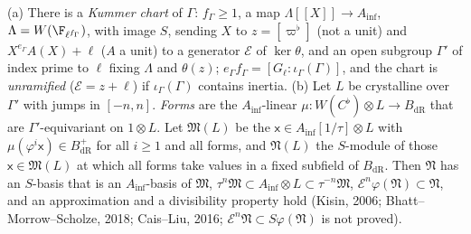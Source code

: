 \begin{fact}
\label{cg-lifting:fact:frame}
(a) There is a \emph{Kummer chart} of $\Gamma$: $f_\Gamma\ge1$, a map $\Lambda[[X]]\to A_{\inf}$,
$\Lambda=W(\F_{\ell^{f_\Gamma}})$, with image $S$, sending $X$ to $z=[\varpi^\flat]$ (not a unit) and
$X^{e_\Gamma}A(X)+\ell$ ($A$ a unit) to a generator $\mathcal E$ of $\ker\theta$, and an open subgroup $\Gamma'$ of index
prime to $\ell$ fixing $\Lambda$ and $\theta(z)$; $e_\Gamma f_\Gamma=[G_\ell:\iota_\Gamma(\Gamma)]$, and the chart is
\emph{unramified} ($\mathcal E=z+\ell$) if $\iota_\Gamma(\Gamma)$ contains inertia.
(b) Let $L$ be crystalline over $\Gamma'$ with jumps in $[-n,n]$. \emph{Forms} are the
$A_{\inf}$-linear $\mu\colon W(C^\flat)\otimes L\to B_{\mathrm{dR}}$ that are $\Gamma'$-equivariant on
$1\otimes L$. Let $\mathfrak M(L)$ be the $\mathsf x\in A_{\inf}[1/\tau]\otimes L$ with
$\mu(\varphi^i\mathsf x)\in B_{\mathrm{dR}}^+$ for all $i\ge1$ and all forms, and $\mathfrak N(L)$ the
$S$-module of those $\mathsf x\in\mathfrak M(L)$ at which all forms take values in a fixed subfield of $B_{\mathrm{dR}}$. Then
$\mathfrak N$ has an $S$-basis that is an $A_{\inf}$-basis of $\mathfrak M$,
$\tau^n\mathfrak M\subset A_{\inf}\otimes L\subset\tau^{-n}\mathfrak M$,
$\mathcal E^n\varphi(\mathfrak N)\subset\mathfrak N$, and an approximation and a divisibility property hold
(Kisin, 2006; Bhatt--Morrow--Scholze, 2018; Cais--Liu, 2016; $\mathcal E^n\mathfrak N\subset
S\varphi(\mathfrak N)$ is not proved).
\end{fact}

